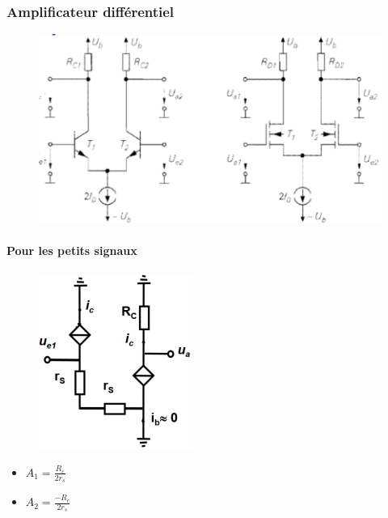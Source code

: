\documentclass[resume]{subfiles}
\begin{document}
\begin{multicols}{3}
\subsubsection{Amplificateur différentiel}
\begin{figure}[H]
    \centering
    \includegraphics[width=0.8\columnwidth]{../images/OpAmp1/m_diff.png}
\end{figure}
\paragraph{Pour les petits signaux}
\begin{figure}[H]
    \centering
    \includegraphics[width=0.5\columnwidth]{../images/OpAmp1/mPS_diff.png}
\end{figure}
\begin{itemize}
\item $A_1 = \frac{R_c}{2r_s}$
\item $A_2 = \frac{-R_c}{2r_s}$
\end{itemize}


\end{multicols}
\end{document}
